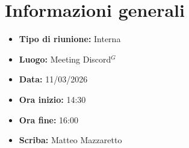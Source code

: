 \section{Informazioni generali}

\begin{itemize}
    \item \textbf{Tipo di riunione:} Interna
    \item \textbf{Luogo:} Meeting Discord$^G$
    \item \textbf{Data:} 11/03/2026
    \item \textbf{Ora inizio:} 14:30
    \item \textbf{Ora fine:} 16:00
    \item \textbf{Scriba:} Matteo Mazzaretto
\end{itemize}